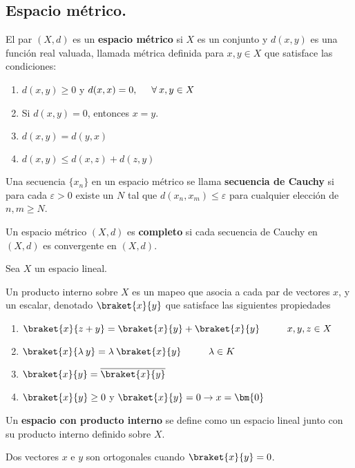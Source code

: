 \subsection{Espacio métrico.}
\begin{defi}
El par $(X, d)$ es un \textbf{espacio métrico} si $X$ es un conjunto y $d(x, y)$ es una función real valuada, llamada métrica definida para $x, y \in X$ que satisface las condiciones:
\begin{enumerate}
\item $d(x, y) \geq 0$ y $d(x, x) = 0, \hspace{0.5cm} \forall \: x, y \in X$
\item  Si $d(x, y) = 0$, entonces $x = y$.
\item $d(x, y) = d(y, x)$
\item $d(x, y) \leq d(x, z) + d(z, y)$
\end{enumerate}
\end{defi}
Una secuencia $\{x_{n}\}$ en un espacio métrico se llama \textbf{secuencia de Cauchy} si para cada $\varepsilon > 0$ existe un $N$ tal que $d(x_{n}, x_{m}) \leq \varepsilon$ para cualquier elección de $n, m \geq N$.
\par
Un espacio métrico $(X , d)$ es \textbf{completo} si cada secuencia de Cauchy en $(X , d)$ es convergente en $(X , d)$.
\begin{defi}Sea $X$ un espacio lineal.
    
Un producto interno sobre $X$ es un mapeo que asocia a cada par de vectores $x$, y un escalar, denotado $ \braket{x}{y}$ que satisface las siguientes propiedades
\begin{enumerate}[label=\roman*.]
\item $\braket{x}{z+y} = \braket{x}{y} + \braket{x}{y} \hspace{1cm} x, y, z \in X$
\item $\braket{x}{\lambda \: y} = \lambda \: \braket{x}{y} \hspace{1cm} \lambda \in K$
\item $\braket{x}{y} = \overline{\braket{x}{y}}$
\item $\braket{x}{y} \geq 0$ y $\braket{x}{y} = 0 \rightarrow x = \bm{0} $ 
\end{enumerate}
\end{defi}
Un \textbf{espacio con producto interno} se define como un espacio lineal junto con su producto interno definido sobre $X$.
\begin{defi}
Dos vectores $x$ e $y$ son ortogonales cuando $\braket{x}{y} = 0$.
\end{defi}
